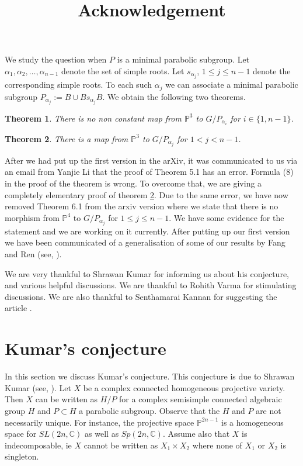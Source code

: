 \documentclass[a4paper,11pt]{amsart}
\newtheorem{theorem}{Theorem}[section]
\begin{document}
We study the question when $P$ is a minimal parabolic subgroup. Let $\alpha_1, \alpha_2, \ldots, \alpha_{n-1}$ denote the set of simple roots. Let $s_{\alpha_j}$, $1 \leq j \leq n-1$ denote the corresponding simple roots. To each such $\alpha_j$ we can associate a minimal parabolic subgroup $P_{\alpha_j} := B \cup Bs_{\alpha_j}B$. We obtain the following two theorems. 

\begin{theorem} There is no non constant map from $\mathbb{P}^3$ to $G/P_{\alpha_i}$ for $i \in \{1, n-1\}$.
\end{theorem}
\begin{theorem}\label{thm1} There is a map from $\mathbb{P}^3$ to $G/P_{\alpha_j}$ for $1 < j < n-1$. 
\end{theorem}

After we had put up the first version in the arXiv, it was communicated to us via an email from Yanjie Li that the proof of Theorem 5.1 has an error. Formula (8) in the proof of the theorem is wrong. To overcome that, we are giving a completely elementary proof of theorem \ref{thm1}. Due to the same error, we have now removed Theorem 6.1 from the arxiv version where we state that there is no morphism from $\mathbb{P}^4$ to $G/P_{\alpha_j}$ for $1 \leq j \leq n-1$. We have some evidence for the statement and we are working on it currently. After putting up our first version we have been communicated of a generalisation of some of our results by Fang and Ren (see, \cite{fangren}). 

\title{\bf{Acknowledgement}} 
We are very thankful to Shrawan Kumar for informing us about his conjecture, and various helpful discussions. We are thankful to Rohith Varma for stimulating discussions. We are also thankful to Senthamarai Kannan for suggesting the article \cite{Munoz-etal}. 
\section{Kumar's conjecture}

In this section we discuss Kumar's conjecture. This conjecture is due to Shrawan Kumar (see, \cite{kumarsconj}). 
Let $X$ be a complex connected homogeneous projective variety. Then $X$ can be written as $H/P$ for a complex semisimple connected algebraic group $H$ and $P \subset H$ a parabolic subgroup. Observe that the $H$ and $P$ are not necessarily unique. For instance, the projective space $\mathbb{P}^{2n-1}$ is a homogeneous space for $SL(2n,\mathbb{C})$ as well as $Sp(2n,\mathbb{C})$. Assume also that $X$ is indecomposable, ie $X$ cannot be written as $X_1 \times X_2$ where none of $X_1$ or $X_2$ is singleton. 
\end{document}
